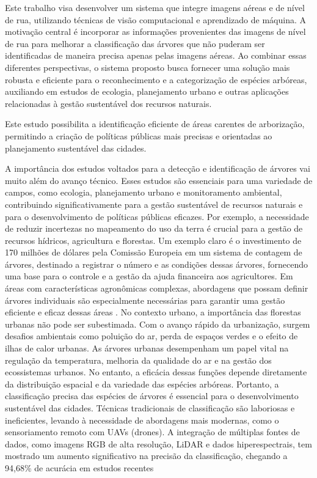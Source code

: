 \documentclass[
    12pt,                   %
    openright,              %
    oneside,                %
    a4paper,                %
    sumario=tradicional,    %
    english,                %
    brazil,                 %
    ]{abntex2}
\begin{document}
    Este trabalho visa desenvolver um sistema que integre imagens aéreas e de nível de rua, utilizando técnicas de visão computacional e aprendizado de máquina. A motivação central é incorporar as informações provenientes das imagens de nível de rua para melhorar a classificação das árvores que não puderam ser identificadas de maneira precisa apenas pelas imagens aéreas. Ao combinar essas diferentes perspectivas, o sistema proposto busca fornecer uma solução mais robusta e eficiente para o reconhecimento e a categorização de espécies arbóreas, auxiliando em estudos de ecologia, planejamento urbano e outras aplicações relacionadas à gestão sustentável dos recursos naturais.

    Este estudo possibilita a identificação eficiente de áreas carentes de arborização, permitindo a criação de políticas públicas mais precisas e orientadas ao planejamento sustentável das cidades.


    A importância dos estudos voltados para a detecção e identificação de árvores vai muito além do avanço técnico. Esses estudos são essenciais para uma variedade de campos, como ecologia, planejamento urbano e monitoramento ambiental, contribuindo significativamente para a gestão sustentável de recursos naturais e para o desenvolvimento de políticas públicas eficazes. Por exemplo, a necessidade de reduzir incertezas no mapeamento do uso da terra é crucial para a gestão de recursos hídricos, agricultura e florestas. Um exemplo claro é o investimento de 170 milhões de dólares pela Comissão Europeia em um sistema de contagem de árvores, destinado a registrar o número e as condições dessas árvores, fornecendo uma base para o controle e a gestão da ajuda financeira aos agricultores. Em áreas com características agronômicas complexas, abordagens que possam definir árvores individuais são especialmente necessárias para garantir uma gestão eficiente e eficaz dessas áreas \cite{daliakopoulos2009tree}.
    No contexto urbano, a importância das florestas urbanas não pode ser subestimada. Com o avanço rápido da urbanização, surgem desafios ambientais como poluição do ar, perda de espaços verdes e o efeito de ilhas de calor urbanas. As árvores urbanas desempenham um papel vital na regulação da temperatura, melhoria da qualidade do ar e na gestão dos ecossistemas urbanos. No entanto, a eficácia dessas funções depende diretamente da distribuição espacial e da variedade das espécies arbóreas. Portanto, a classificação precisa das espécies de árvores é essencial para o desenvolvimento sustentável das cidades. Técnicas tradicionais de classificação são laboriosas e ineficientes, levando à necessidade de abordagens mais modernas, como o sensoriamento remoto com UAVs (drones). A integração de múltiplas fontes de dados, como imagens RGB de alta resolução, LiDAR e dados hiperespectrais, tem mostrado um aumento significativo na precisão da classificação, chegando a 94,68\% de acurácia em estudos recentes \cite{wu2024fine}
    
\end{document}
